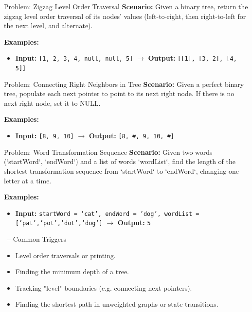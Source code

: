 \begin{frame}[fragile]{Problem: Zigzag Level Order Traversal}
  \textbf{Scenario:}
  Given a binary tree, return the zigzag level order traversal of its nodes' values (left-to-right, then right-to-left for the next level, and alternate).
  
  \vspace{0.3cm}
  \textbf{Examples:}
  \begin{itemize}
    \item \textbf{Input:} \texttt{[1, 2, 3, 4, null, null, 5]} $\rightarrow$ \textbf{Output:} \texttt{[[1], [3, 2], [4, 5]]}
  \end{itemize}
\end{frame}

\begin{frame}[fragile]{Problem: Connecting Right Neighbors in Tree}
  \textbf{Scenario:}
  Given a perfect binary tree, populate each next pointer to point to its next right node. If there is no next right node, set it to NULL.
  
  \vspace{0.3cm}
  \textbf{Examples:}
  \begin{itemize}
    \item \textbf{Input:} \texttt{[8, 9, 10]} $\rightarrow$ \textbf{Output:} \texttt{[8, \#, 9, 10, \#]}
  \end{itemize}
\end{frame}

\begin{frame}[fragile]{Problem: Word Transformation Sequence}
  \textbf{Scenario:}
  Given two words (`startWord`, `endWord`) and a list of words `wordList`, find the length of the shortest transformation sequence from `startWord` to `endWord`, changing one letter at a time.
  
  \vspace{0.3cm}
  \textbf{Examples:}
  \begin{itemize}
    \item \textbf{Input:} \texttt{startWord = 'cat', endWord = 'dog', wordList = ['pat','pot','dot','dog']} $\rightarrow$ \textbf{Output:} \texttt{5}
  \end{itemize}
\end{frame}

\begin{frame}{\secname\ -- Common Triggers}
  \begin{itemize}
    \item Level order traversals or printing.
        \item Finding the minimum depth of a tree.
        \item Tracking "level" boundaries (e.g. connecting next pointers).
        \item Finding the shortest path in unweighted graphs or state transitions.
  \end{itemize}
\end{frame}
